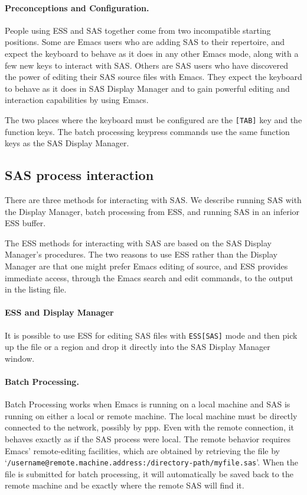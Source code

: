\documentclass{article}
\newcommand{\stexttt}[1]{{\small\texttt{#1}}}
\newcommand{\ssf}[1]{{\small\sf{#1}}}
\newcommand{\file}[1]{`\stexttt{#1}'}
\begin{document}

\paragraph{Preconceptions and Configuration.}

People using ESS and SAS together come from two incompatible starting
positions.  Some are Emacs users who are adding SAS to their
repertoire, and expect the keyboard to behave as it does in any other
Emacs mode, along with a few new keys to interact with SAS.  Others
are SAS users who have discovered the power of editing their SAS
source files with Emacs.  They expect the keyboard to behave as it
does in SAS Display Manager and to gain 
powerful editing and interaction capabilities by using Emacs.

The two places where the keyboard must be configured are the
\texttt{[TAB]} key and the function keys.  The batch processing
keypress commands use the same function keys as the SAS Display
Manager.

\subsection{SAS process interaction}
\label{sec:SAS:proc}

There are three methods for interacting with SAS.  We describe running
SAS with the Display Manager, batch processing from ESS,
and running SAS in an inferior ESS buffer.

The ESS methods for interacting with SAS are based on the SAS Display
Manager's procedures.  The two reasons to use ESS rather than the
Display Manager are that one might prefer Emacs editing of source, and
ESS provides immediate access, through the Emacs search and edit
commands, to the output in the listing file.
 
\paragraph{ESS and Display Manager}
It is possible to use ESS for editing SAS files with
\stexttt{ESS[SAS]} mode and then pick up the file or a region and drop
it directly into the SAS Display Manager \ssf{Program Editor} window.

\paragraph{Batch Processing.}
Batch Processing works when Emacs is running on a local machine and
SAS is running on either a local or remote machine.  The local machine
must be directly connected to the network, possibly by ppp.  Even with
the remote connection, it behaves exactly as if the SAS process were
local.  The remote behavior requires Emacs' remote-editing facilities,
which are obtained by retrieving the file by
\file{/username@remote.machine.address:/directory-path/myfile.sas}.
When the file is submitted for batch processing, it will automatically
be saved back to the remote machine and be exactly where the remote
SAS will find it.
\end{document}
